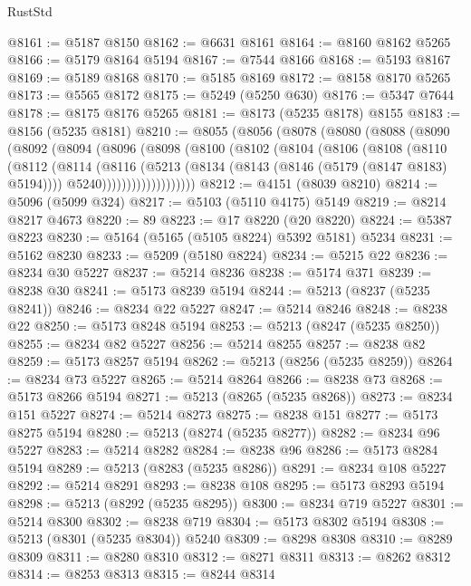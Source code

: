 \begin{lexlean}{RustStd}
\begin{coremodule}
@8161 := @5187 @8150
@8162 := @6631 @8161
@8164 := @8160 @8162 @5265
@8166 := @5179 @8164 @5194
@8167 := @7544 @8166
@8168 := @5193 @8167
@8169 := @5189 @8168
@8170 := @5185 @8169
@8172 := @8158 @8170 @5265
@8173 := @5565 @8172
@8175 := @5249 (@5250 @630)
@8176 := @5347 @7644
@8178 := @8175 @8176 @5265
@8181 := @8173 (@5235 @8178) @8155
@8183 := @8156 (@5235 @8181)
@8210 := @8055
    (@8056
      (@8078
        (@8080
          (@8088
            (@8090
              (@8092
                (@8094
                  (@8096
                    (@8098
                      (@8100
                        (@8102
                          (@8104
                            (@8106
                              (@8108
                                (@8110
                                  (@8112
                                    (@8114
                                      (@8116
                                        (@5213
                                          (@8134 (@8143 (@8146 (@5179 (@8147 @8183) @5194))))
                                          @5240)))))))))))))))))))
@8212 := @4151 (@8039 @8210)
@8214 := @5096 (@5099 @324)
@8217 := @5103 (@5110 @4175) @5149
@8219 := @8214 @8217 @4673
@8220 := 89
@8223 := @17 @8220 (@20 @8220)
@8224 := @5387 @8223
@8230 := @5164 (@5165 (@5105 @8224) @5392 @5181) @5234
@8231 := @5162 @8230
@8233 := @5209 (@5180 @8224)
@8234 := @5215 @22
@8236 := @8234 @30 @5227
@8237 := @5214 @8236
@8238 := @5174 @371
@8239 := @8238 @30
@8241 := @5173 @8239 @5194
@8244 := @5213 (@8237 (@5235 @8241))
@8246 := @8234 @22 @5227
@8247 := @5214 @8246
@8248 := @8238 @22
@8250 := @5173 @8248 @5194
@8253 := @5213 (@8247 (@5235 @8250))
@8255 := @8234 @82 @5227
@8256 := @5214 @8255
@8257 := @8238 @82
@8259 := @5173 @8257 @5194
@8262 := @5213 (@8256 (@5235 @8259))
@8264 := @8234 @73 @5227
@8265 := @5214 @8264
@8266 := @8238 @73
@8268 := @5173 @8266 @5194
@8271 := @5213 (@8265 (@5235 @8268))
@8273 := @8234 @151 @5227
@8274 := @5214 @8273
@8275 := @8238 @151
@8277 := @5173 @8275 @5194
@8280 := @5213 (@8274 (@5235 @8277))
@8282 := @8234 @96 @5227
@8283 := @5214 @8282
@8284 := @8238 @96
@8286 := @5173 @8284 @5194
@8289 := @5213 (@8283 (@5235 @8286))
@8291 := @8234 @108 @5227
@8292 := @5214 @8291
@8293 := @8238 @108
@8295 := @5173 @8293 @5194
@8298 := @5213 (@8292 (@5235 @8295))
@8300 := @8234 @719 @5227
@8301 := @5214 @8300
@8302 := @8238 @719
@8304 := @5173 @8302 @5194
@8308 := @5213 (@8301 (@5235 @8304)) @5240
@8309 := @8298 @8308
@8310 := @8289 @8309
@8311 := @8280 @8310
@8312 := @8271 @8311
@8313 := @8262 @8312
@8314 := @8253 @8313
@8315 := @8244 @8314

\end{coremodule}
\end{lexlean}
